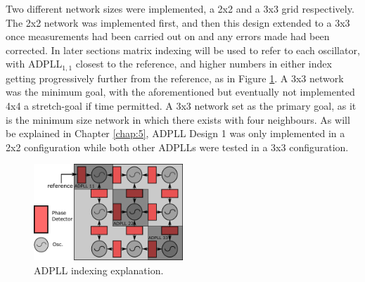 Two different network sizes were implemented, a 2x2 and a 3x3 grid respectively. The 2x2 network was implemented first, and then this design extended to a 3x3 once measurements had been carried out on and any errors made had been corrected. In later sections matrix indexing will be used to refer to each oscillator, with \ac{ADPLL}$_{1,1}$ closest to the reference, and higher numbers in either index getting progressively further from the reference, as in Figure \ref{fig:network_mine}. A 3x3 network was the minimum goal, with the aforementioned but eventually not implemented 4x4 a stretch-goal if time permitted. A 3x3 network set as the primary goal, as it is the minimum size network in which there exists  with four neighbours. As will be explained in Chapter \ref{chap:5}, \ac{ADPLL} Design 1 was only implemented in a 2x2 configuration while both other \acp{ADPLL} were tested in a 3x3 configuration.


\begin{figure}[h]
	\centering
	\includegraphics[width=0.5\textwidth]{../network_annotated}
	\caption[ADPLL indexing explanation]{ADPLL indexing explanation.}
	\label{fig:network_mine}
\end{figure}




